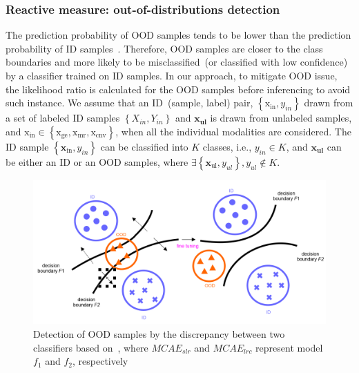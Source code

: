 \subsubsection{Reactive measure: out-of-distributions detection}
\noindent The prediction probability of OOD samples tends to be lower than the prediction probability of ID samples~\cite{OOD18}. Therefore, OOD samples are closer to the class boundaries and more likely to be misclassified~(or classified with low confidence) by a classifier trained on ID samples. In our approach, to mitigate OOD issue, the likelihood ratio is calculated for the OOD samples before inferencing to avoid such instance.  
We assume that an ID~(sample, label) pair, $\left\{\mathrm{x}_{\text {in}}, y_{in}\right\}$ drawn from a set of labeled ID samples $\left\{X_{in}, Y_{in}\right\}$ and $\mathbf{x}_{\mathbf{ul}}$ is drawn from unlabeled samples, and $\mathrm{x}_\text{in} \in \left\{\mathrm{x}_{\text {ge}}, \mathrm{x}_{\text {mr}}, \mathrm{x}_{\text {cnv}}\right\}$, when all the individual modalities are considered. The ID sample $\left\{\mathbf{x}_{\text {in}}, y_{in}\right\}$ can be classified into $K$ classes, i.e., $y_{in} \in K$, and $\mathbf{x}_{\mathbf{ul}}$ can be either an ID or an OOD samples, where $\exists\left\{\mathbf{x}_{\text {ul}}, y_{ul}\right\}, y_{ul} \notin K$. 

\begin{figure}
    \centering
    \includegraphics[scale=0.6]{images/ood_ex_1.png}
    \caption[OOD sample detection w.r.t discrepancy between two different  classifiers]{Detection of OOD samples by the discrepancy between two classifiers based on~\cite{OOD19}, where $MCAE_{slr}$ and $MCAE_{lrc}$ represent model $f_1$ and $f_2$, respectively}
    \label{fig:ood_detection_example}
    \vspace{-4mm}
\end{figure}

